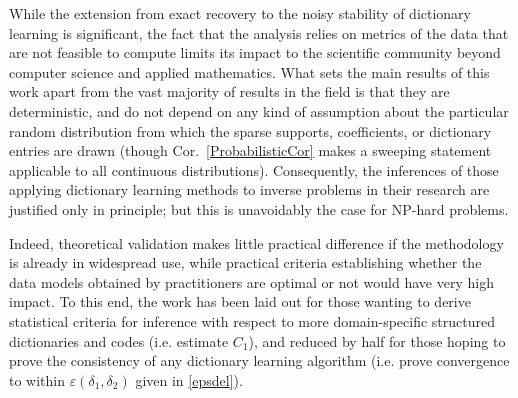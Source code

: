 
While the extension from exact recovery to the noisy stability of dictionary learning is significant, the fact that the analysis relies on metrics of the data that are not feasible to compute limits its impact to the scientific community beyond computer science and applied mathematics. What sets the main results of this work apart from the vast majority of results in the field is that they are deterministic, and do not depend on any kind of assumption about the particular random distribution from which the sparse supports, coefficients, or dictionary entries are drawn (though Cor.~\ref{ProbabilisticCor} makes a sweeping statement applicable to all continuous distributions). Consequently, the inferences of those applying dictionary learning methods to inverse problems in their research are justified only in principle; but this is unavoidably the case for NP-hard problems. 

Indeed, theoretical validation makes little practical difference if the methodology is already in widespread use, while practical criteria establishing whether the data models obtained by practitioners are optimal or not would have very high impact. To this end, the work has been laid out for those wanting to derive statistical criteria for inference with respect to more domain-specific structured dictionaries and codes (i.e. estimate $C_1$), and reduced by half for those hoping to prove the consistency of any dictionary learning algorithm (i.e. prove convergence to within $\varepsilon(\delta_1,\delta_2)$ given in \eqref{epsdel}). 


